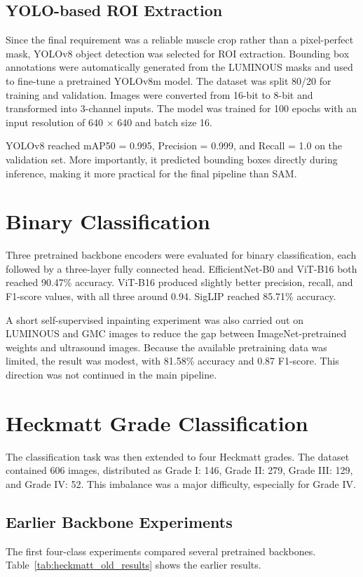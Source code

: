 ﻿\documentclass[12pt,a4paper]{report}
\begin{document}
\subsection{YOLO-based ROI Extraction}
Since the final requirement was a reliable muscle crop rather than a pixel-perfect mask, YOLOv8 object detection was selected for ROI extraction. Bounding box annotations were automatically generated from the LUMINOUS masks and used to fine-tune a pretrained YOLOv8m model. The dataset was split 80/20 for training and validation. Images were converted from 16-bit to 8-bit and transformed into 3-channel inputs. The model was trained for 100 epochs with an input resolution of 640 $\times$ 640 and batch size 16.

YOLOv8 reached mAP50 = 0.995, Precision = 0.999, and Recall = 1.0 on the validation set. More importantly, it predicted bounding boxes directly during inference, making it more practical for the final pipeline than SAM.

\section{Binary Classification}
Three pretrained backbone encoders were evaluated for binary classification, each followed by a three-layer fully connected head. EfficientNet-B0 and ViT-B16 both reached 90.47\% accuracy. ViT-B16 produced slightly better precision, recall, and F1-score values, with all three around 0.94. SigLIP reached 85.71\% accuracy.

A short self-supervised inpainting experiment was also carried out on LUMINOUS and GMC images to reduce the gap between ImageNet-pretrained weights and ultrasound images. Because the available pretraining data was limited, the result was modest, with 81.58\% accuracy and 0.87 F1-score. This direction was not continued in the main pipeline.

\section{Heckmatt Grade Classification}
The classification task was then extended to four Heckmatt grades. The dataset contained 606 images, distributed as Grade I: 146, Grade II: 279, Grade III: 129, and Grade IV: 52. This imbalance was a major difficulty, especially for Grade IV.

\subsection{Earlier Backbone Experiments}
The first four-class experiments compared several pretrained backbones. Table~\ref{tab:heckmatt_old_results} shows the earlier results.
\end{document}
